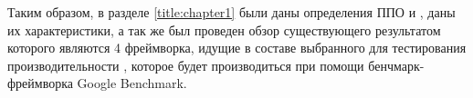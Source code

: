 Таким образом, в разделе \ref{title:chapter1} были даны определения ППО и \marm{}, даны их характеристики, а так же был проведен обзор существующего \marm{} результатом которого являются 4 фреймворка, идущие в составе выбранного для тестирования производительности \marm{}, которое будет производиться при помощи бенчмарк-фреймворка Google Benchmark.